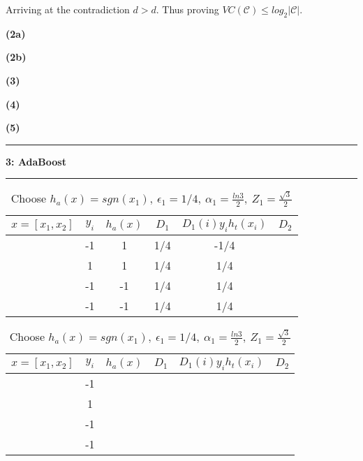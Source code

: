 \documentclass[11pt]{article}
\newcommand\question[2]{\vspace{.25in}\hrule\textbf{#1: #2}\vspace{.5em}\hrule\vspace{.10in}}
\renewcommand\part[1]{\vspace{.10in}\textbf{(#1)}}
\begin{document}
Arriving at the contradiction $d > d$. Thus proving $VC(\mathcal{C}) \leq log_2|\mathcal{C}|$.

\part{2a}

\part{2b}

\part{3}

\part{4}

\part{5}

\question{3}{AdaBoost}

\begin{table}[H]
\centering
{\renewcommand{\arraystretch}{1.2}%
\begin{tabular}{| c | c | c | c | c | c |}
\hline
$x = [x_1, x_2]$& $y_i$ & $h_a(x)$ & $D_1$ & $D_1(i)y_ih_t(x_i)$ & $D_2$\\
\hline
[1,1] & -1 & 1 & 1/4 & -1/4 & \\ \hline
[1,-1] & 1 & 1 & 1/4 & 1/4 & \\ \hline
[-1,-1] & -1 & -1 & 1/4 & 1/4 & \\ \hline
[-1,1] & -1 & -1 & 1/4 & 1/4 & \\ \hline
\end{tabular}}
\caption{Choose $h_a(x) = sgn(x_1), \ \epsilon_1 = 1/4, \ \alpha_1 = \frac{ln3}{2}, \ Z_1 = \frac{\sqrt{3}}{2}$}
\end{table}

\begin{table}[H]
\centering
{\renewcommand{\arraystretch}{1.2}%
\begin{tabular}{| c | c | c | c | c | c |}
\hline
$x = [x_1, x_2]$& $y_i$ & $h_a(x)$ & $D_1$ & $D_1(i)y_ih_t(x_i)$ & $D_2$\\
\hline
[1,1] & -1 &  &  &  & \\ \hline
[1,-1] & 1 &  &  &  & \\ \hline
[-1,-1] & -1 &  & &  & \\ \hline
[-1,1] & -1 &  &  &  & \\ \hline
\end{tabular}}
\caption{Choose $h_a(x) = sgn(x_1), \ \epsilon_1 = 1/4, \ \alpha_1 = \frac{ln3}{2}, \ Z_1 = \frac{\sqrt{3}}{2}$}
\end{table}
\end{document}
